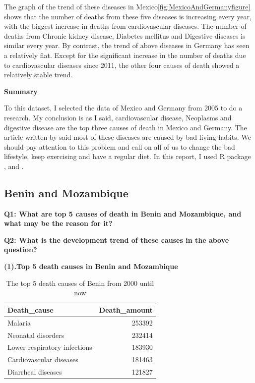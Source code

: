 \documentclass[11pt,a4paper,]{article}
\begin{document}
The graph of the trend of these diseases in Mexico\ref{fig:MexicoAndGermanyfigure} shows that the number of deaths from these five diseases is increasing every year, with the biggest increase in deaths from cardiovascular diseases. The number of deaths from Chronic kidney disease, Diabetes mellitus and Digestive diseases is similar every year. By contrast, the trend of above diseases in Germany has seen a relatively flat. Except for the significant increase in the number of deaths due to cardiovascular diseases since 2011, the other four causes of death showed a relatively stable trend.

\textbf{Summary}

To this dataset, I selected the data of Mexico and Germany from 2005 to do a research. My conclusion is as I said, cardiovascular disease, Neoplasms and digestive disease are the top three causes of death in Mexico and Germany. The article written by \textcite{miller1997exercise} said most of these diseases are caused by bad living habits. We should pay attention to this problem and call on all of us to change the bad lifestyle, keep exercising and have a regular diet. In this report, I used R package \textcite{tidyverse}, \textcite{ggplot2} and \textcite{readr}.

\clearpage

\hypertarget{benin-and-mozambique}{%
\subsection{Benin and Mozambique}\label{benin-and-mozambique}}

\textbf{Q1: What are top 5 causes of death in Benin and Mozambique, and what may be the reason for it?}

\textbf{Q2: What is the development trend of these causes in the above question?}

\textbf{(1).Top 5 death causes in Benin and Mozambique}

\begin{table}

\caption{\label{tab:Benintopfivedeathrate}The top 5 death causes of Benin from 2000 until now}
\centering
\begin{tabular}[t]{l|r}
\hline
Death\_cause & Death\_amount\\
\hline
Malaria & 253392\\
\hline
Neonatal disorders & 232414\\
\hline
Lower respiratory infections & 183930\\
\hline
Cardiovascular diseases & 181463\\
\hline
Diarrheal diseases & 121827\\
\hline
\end{tabular}
\end{table}
\end{document}
